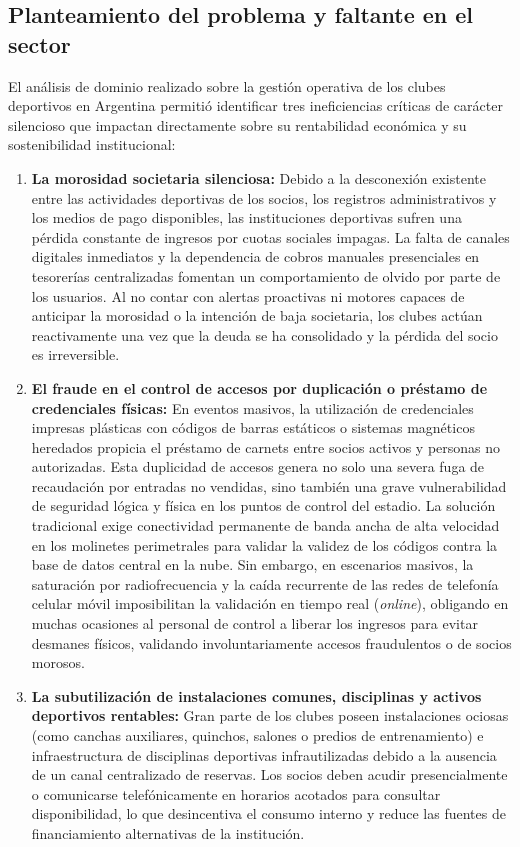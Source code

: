 \documentclass[conference, a4paper]{IEEEtran}
\begin{document}
\subsection{Planteamiento del problema y faltante en el sector}
El an\'alisis de dominio realizado sobre la gesti\'on operativa de los clubes deportivos en Argentina permiti\'o identificar tres ineficiencias cr\'iticas de car\'acter silencioso que impactan directamente sobre su rentabilidad econ\'omica y su sostenibilidad institucional:

\begin{enumerate}
    \item \textbf{La morosidad societaria silenciosa:} Debido a la desconexi\'on existente entre las actividades deportivas de los socios, los registros administrativos y los medios de pago disponibles, las instituciones deportivas sufren una p\'erdida constante de ingresos por cuotas sociales impagas. La falta de canales digitales inmediatos y la dependencia de cobros manuales presenciales en tesorer\'ias centralizadas fomentan un comportamiento de olvido por parte de los usuarios. Al no contar con alertas proactivas ni motores capaces de anticipar la morosidad o la intenci\'on de baja societaria, los clubes act\'uan reactivamente una vez que la deuda se ha consolidado y la p\'erdida del socio es irreversible.
    \item \textbf{El fraude en el control de accesos por duplicaci\'on o pr\'estamo de credenciales f\'isicas:} En eventos masivos, la utilizaci\'on de credenciales impresas pl\'asticas con c\'odigos de barras est\'aticos o sistemas magn\'eticos heredados propicia el pr\'estamo de carnets entre socios activos y personas no autorizadas. Esta duplicidad de accesos genera no solo una severa fuga de recaudaci\'on por entradas no vendidas, sino tambi\'en una grave vulnerabilidad de seguridad l\'ogica y f\'isica en los puntos de control del estadio. La soluci\'on tradicional exige conectividad permanente de banda ancha de alta velocidad en los molinetes perimetrales para validar la validez de los c\'odigos contra la base de datos central en la nube. Sin embargo, en escenarios masivos, la saturaci\'on por radiofrecuencia y la ca\'ida recurrente de las redes de telefon\'ia celular m\'ovil imposibilitan la validaci\'on en tiempo real (\textit{online}), obligando en muchas ocasiones al personal de control a liberar los ingresos para evitar desmanes f\'isicos, validando involuntariamente accesos fraudulentos o de socios morosos.
    \item \textbf{La subutilizaci\'on de instalaciones comunes, disciplinas y activos deportivos rentables:} Gran parte de los clubes poseen instalaciones ociosas (como canchas auxiliares, quinchos, salones o predios de entrenamiento) e infraestructura de disciplinas deportivas infrautilizadas debido a la ausencia de un canal centralizado de reservas. Los socios deben acudir presencialmente o comunicarse telef\'onicamente en horarios acotados para consultar disponibilidad, lo que desincentiva el consumo interno y reduce las fuentes de financiamiento alternativas de la instituci\'on.
\end{enumerate}
\end{document}
